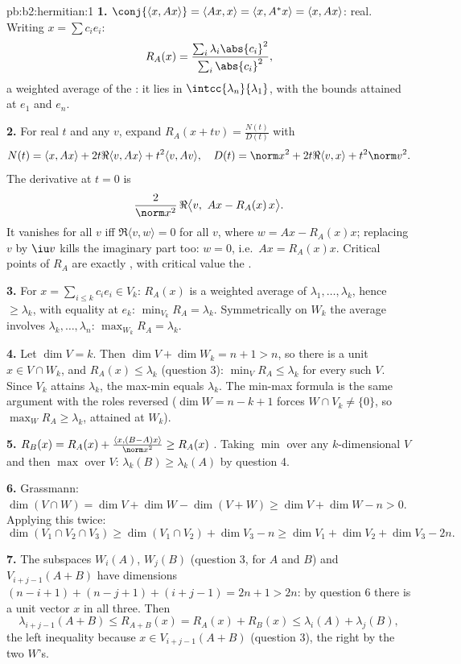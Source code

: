 \begin{solution}{pb:b2:hermitian:1}
\textbf{1.} $\conj{\langle x, Ax\rangle} = \langle Ax, x\rangle
= \langle x, A^*x\rangle = \langle x, Ax\rangle$: real. Writing
$x = \sum c_ie_i$:
\[
R_A(x) = \frac{\sum_i\lambda_i\abs{c_i}^2}
{\sum_i\abs{c_i}^2} ,
\]
a weighted average of the : it lies in
$\intcc{\lambda_n}{\lambda_1}$, with the bounds attained at
$e_1$ and $e_n$.

\textbf{2.} For real $t$ and any $v$, expand $R_A(x + tv) =
\frac{N(t)}{D(t)}$ with
\[
N(t) = \langle x, Ax\rangle + 2t\Re\langle v, Ax\rangle +
t^2\langle v, Av\rangle,
\quad
D(t) = \norm x^2 + 2t\Re\langle v, x\rangle + t^2\norm v^2 .
\]
The derivative at $t = 0$ is
\[
\frac{2}{\norm x^2}\,
\Re\bigl\langle v,\ Ax - R_A(x)\,x\bigr\rangle .
\]
It vanishes for all $v$ iff $\Re\langle v, w\rangle = 0$ for
all $v$, where $w = Ax - R_A(x)x$; replacing $v$ by $\iu v$
kills the imaginary part too: $w = 0$, i.e.\ $Ax = R_A(x)x$.
Critical points of $R_A$ are exactly , with
critical value the .

\textbf{3.} For $x = \sum_{i\leq k}c_ie_i \in V_k$: $R_A(x)$ is
a weighted average of $\lambda_1, \dots, \lambda_k$, hence
$\geq \lambda_k$, with equality at $e_k$: $\min_{V_k} R_A =
\lambda_k$. Symmetrically on $W_k$ the average involves
$\lambda_k, \dots, \lambda_n$: $\max_{W_k}R_A = \lambda_k$.

\textbf{4.} Let $\dim V = k$. Then $\dim V + \dim W_k = n + 1 >
n$, so there is a unit $x \in V \cap W_k$, and $R_A(x) \leq
\lambda_k$ (question 3): $\min_{V}R_A \leq \lambda_k$ for every
such $V$. Since $V_k$ attains $\lambda_k$, the max-min equals
$\lambda_k$. The min-max formula is the same argument with the
roles reversed ($\dim W = n - k + 1$ forces $W \cap V_k \neq
\{0\}$, so $\max_W R_A \geq \lambda_k$, attained at $W_k$).

\textbf{5.} $R_B(x) = R_A(x) + \frac{\langle x,
(B-A)x\rangle}{\norm x^2} \geq R_A(x)$ . Taking
$\min$ over any $k$-dimensional $V$ and then $\max$ over $V$:
$\lambda_k(B) \geq \lambda_k(A)$ by question 4.

\textbf{6.} Grassmann: $\dim(V\cap W) = \dim V + \dim W -
\dim(V + W) \geq \dim V + \dim W - n > 0$. Applying this twice:
\[
\dim(V_1\cap V_2\cap V_3)
\geq \dim(V_1\cap V_2) + \dim V_3 - n
\geq \dim V_1 + \dim V_2 + \dim V_3 - 2n .
\]

\textbf{7.} The subspaces $W_i(A)$, $W_j(B)$ (question 3, for
$A$ and $B$) and $V_{i+j-1}(A+B)$ have dimensions $(n-i+1) +
(n-j+1) + (i+j-1) = 2n + 1 > 2n$: by question 6 there is a unit
vector $x$ in all three. Then
\[
\lambda_{i+j-1}(A+B) \leq R_{A+B}(x)
= R_A(x) + R_B(x) \leq \lambda_i(A) + \lambda_j(B),
\]
the left inequality because $x \in V_{i+j-1}(A+B)$ (question
3), the right by the two $W$'s.


\end{solution}
